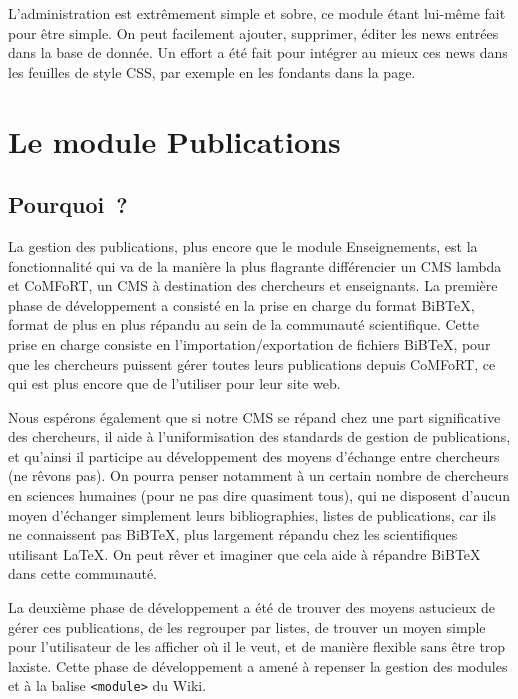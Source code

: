 \documentclass[final,11pt,a4paper,twoside,titlepage]{article}
\newcommand{\p}{\vspace{0.3em}}
\newcommand{\code}[1]{\texttt{#1}}
\begin{document}
{    L'administration est extrêmement simple et sobre, ce module étant lui-même 
    fait pour être simple. On peut facilement ajouter, supprimer, éditer les
    news entrées dans la base de donnée. Un effort a été fait pour intégrer au
    mieux ces news dans les feuilles de style CSS, par exemple en les fondants
    dans la page.
    
  \section{Le module Publications}
    \subsection{Pourquoi~?}
    La gestion des publications, plus encore que le module Enseignements, est
    la fonctionnalité qui va de la manière la plus flagrante différencier un 
    CMS lambda et CoMFoRT, un CMS à destination des chercheurs et enseignants.
    La première phase de développement a consisté en la prise en charge du 
    format BiBTeX, format de plus en plus répandu au sein de la communauté
    scientifique. Cette prise en charge consiste en l'importation/exportation
    de fichiers BiBTeX, pour que les chercheurs puissent gérer toutes leurs 
    publications depuis CoMFoRT, ce qui est plus encore que de l'utiliser pour
    leur site web. \p

    Nous espérons également que si notre CMS se répand chez une part significative
    des chercheurs, il aide à l'uniformisation des standards de gestion de 
    publications, et qu'ainsi il participe au développement des moyens d'échange
    entre chercheurs (ne rêvons pas). On pourra penser notamment à un certain 
    nombre de chercheurs en sciences humaines (pour ne pas dire quasiment tous),
    qui ne disposent d'aucun moyen d'échanger simplement leurs bibliographies,
    listes de publications, car ils ne connaissent pas BiBTeX, plus largement
    répandu chez les scientifiques utilisant \LaTeX{}. On peut rêver et imaginer
    que cela aide à répandre BiBTeX dans cette communauté. \p

    La deuxième phase de développement a été de trouver des moyens astucieux 
    de gérer ces publications, de les regrouper par listes, de trouver un 
    moyen simple pour l'utilisateur de les afficher où il le veut, et de manière
    flexible sans être trop laxiste. Cette phase de développement a amené à 
    repenser la gestion des modules et à la balise \code{<module>} du Wiki. \p

}
\end{document}
